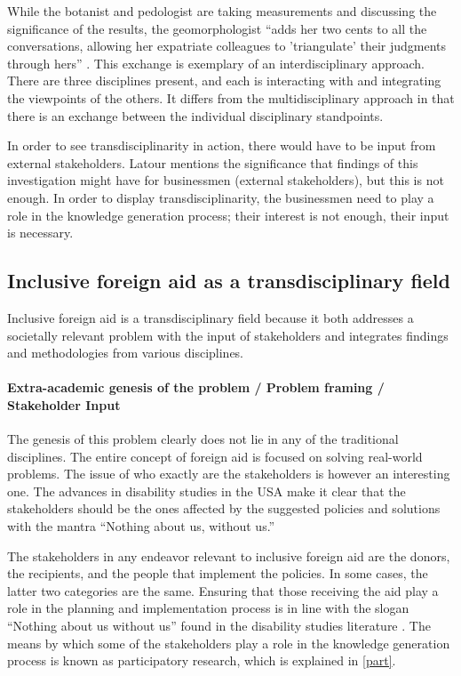\documentclass[a4paper]{article}
\begin{document}
While the botanist and pedologist are taking measurements and discussing the
significance of the results, the geomorphologist ``adds her two cents to all
the conversations, allowing her expatriate colleagues to 'triangulate' their
judgments through hers'' \citep{latour1999circulating}. This exchange is
exemplary of an interdisciplinary approach. There are three disciplines
present, and each is interacting with  and integrating the viewpoints of the
others. It differs from the multidisciplinary approach in that there is an
exchange between the individual disciplinary standpoints.

In order to see transdisciplinarity in action, there would have to be input
from external stakeholders. Latour mentions the significance that findings of
this investigation might have for businessmen (external stakeholders), but
this is not enough. In order to display transdisciplinarity, the businessmen
need to play a role in the knowledge generation process; their interest is not
enough, their input is necessary.




\subsection{Inclusive foreign aid as a transdisciplinary field}

Inclusive foreign aid is a transdisciplinary field because it both addresses a
societally relevant problem with the input of stakeholders and integrates
findings and methodologies from various disciplines.

\paragraph{Extra-academic genesis of the problem / Problem framing /
Stakeholder Input}

The genesis of this problem clearly does not lie in any of the traditional
disciplines. The entire concept of foreign aid is focused on solving
real-world problems. The issue of who exactly are the stakeholders is however
an interesting one. The advances in disability studies in the USA make it
clear that the stakeholders should be the ones affected by the suggested
policies and solutions with the mantra ``Nothing about us, without us.''

The stakeholders in any endeavor relevant to inclusive foreign aid are the
donors, the recipients, and the people that implement the policies. In some
cases, the latter two categories are the same. Ensuring that those receiving
the aid play a role in the planning and implementation process is in line with
the slogan ``Nothing about us without us'' found in the disability studies
literature \citep{pfeiffer2000disability}. The means by which some of the
stakeholders play a role in the knowledge generation process is known as
participatory research, which is explained in \autoref{part}.
\end{document}
